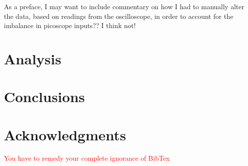 \documentclass[12pt]{article}
\begin{document}
As a preface, I may want to include commentary on how I had to manually alter the data, based on readings from the oscilloscope, in order to account for the imbalance in picoscope inputs?? I think not!








\section{Analysis}




\section{Conclusions}


\section{Acknowledgments}

\textcolor{red}{You have to remedy your complete ignorance of BibTex}
\end{document}
